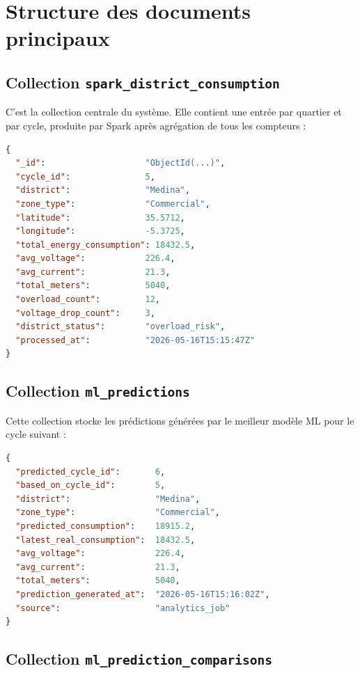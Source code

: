 \documentclass[12pt,a4paper]{report}
\begin{document}
\section{Structure des documents principaux}

\subsection{Collection \texttt{spark\_district\_consumption}}

C'est la collection centrale du système. Elle contient une entrée par quartier
et par cycle, produite par Spark après agrégation de tous les compteurs :

\begin{lstlisting}[language=json, caption={Document type — spark\_district\_consumption}]
{
  "_id":                    "ObjectId(...)",
  "cycle_id":               5,
  "district":               "Medina",
  "zone_type":              "Commercial",
  "latitude":               35.5712,
  "longitude":              -5.3725,
  "total_energy_consumption": 18432.5,
  "avg_voltage":            226.4,
  "avg_current":            21.3,
  "total_meters":           5040,
  "overload_count":         12,
  "voltage_drop_count":     3,
  "district_status":        "overload_risk",
  "processed_at":           "2026-05-16T15:15:47Z"
}
\end{lstlisting}

\subsection{Collection \texttt{ml\_predictions}}

Cette collection stocke les prédictions générées par le meilleur modèle ML
pour le cycle suivant :

\begin{lstlisting}[language=json, caption={Document type — ml\_predictions}]
{
  "predicted_cycle_id":       6,
  "based_on_cycle_id":        5,
  "district":                 "Medina",
  "zone_type":                "Commercial",
  "predicted_consumption":    18915.2,
  "latest_real_consumption":  18432.5,
  "avg_voltage":              226.4,
  "avg_current":              21.3,
  "total_meters":             5040,
  "prediction_generated_at":  "2026-05-16T15:16:02Z",
  "source":                   "analytics_job"
}
\end{lstlisting}

\subsection{Collection \texttt{ml\_prediction\_comparisons}}
\end{document}
